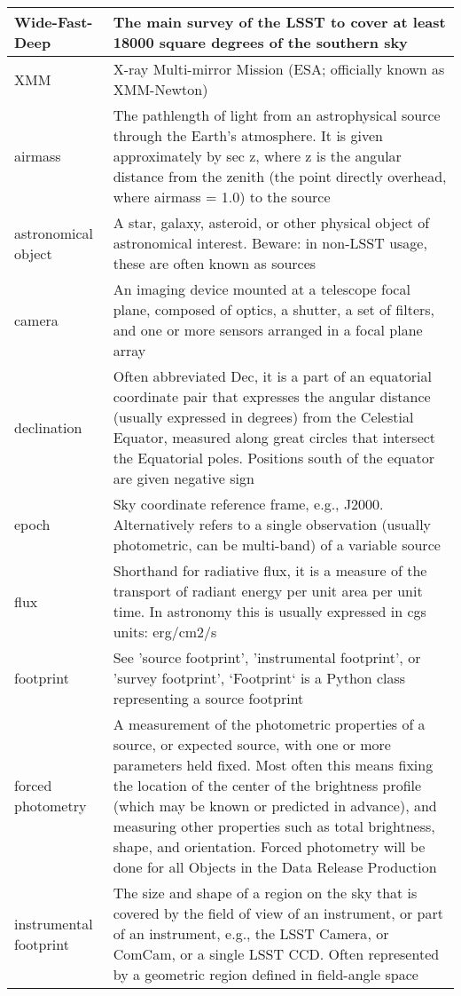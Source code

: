 \begin{longtable}{|p{}|p{}|}
Wide-Fast-Deep & The main survey of the \gls{LSST} to cover at least 18000 square degrees of the southern sky \\\hline
XMM & X-ray Multi-mirror Mission (\gls{ESA}; officially known as \gls{XMM}-Newton) \\\hline
airmass & The pathlength of light from an astrophysical source through the Earth's atmosphere. It is given approximately by sec z, where z is the angular distance from the zenith (the point directly overhead, where \gls{airmass} = 1.0) to the source \\\hline
astronomical object & A star, galaxy, asteroid, or other physical object of astronomical interest. Beware: in non-LSST usage, these are often known as sources \\\hline
camera & An imaging device mounted at a telescope focal plane, composed of optics, a shutter, a set of filters, and one or more sensors arranged in a focal plane array \\\hline
declination & Often abbreviated Dec, it is a part of an equatorial coordinate pair that expresses the angular distance (usually expressed in degrees) from the Celestial Equator, measured along great circles that intersect the Equatorial poles. Positions south of the equator are given negative sign \\\hline
epoch & Sky coordinate reference frame, e.g., J2000. Alternatively refers to a single observation (usually photometric, can be multi-band) of a variable source \\\hline
flux & Shorthand for radiative \gls{flux}, it is a measure of the transport of radiant energy per unit area per unit time. In astronomy this is usually expressed in cgs units: erg/cm2/s \\\hline
footprint & See 'source \gls{footprint}', 'instrumental \gls{footprint}', or 'survey \gls{footprint}', `Footprint` is a Python class representing a source \gls{footprint} \\\hline
forced photometry & A measurement of the photometric properties of a source, or expected source, with one or more parameters held fixed. Most often this means fixing the location of the center of the brightness profile (which may be known or predicted in advance), and measuring other properties such as total brightness, \gls{shape}, and orientation. Forced photometry will be done for all Objects in the \gls{Data Release Production} \\\hline
instrumental \gls{footprint} & The size and \gls{shape} of a region on the sky that is covered by the field of view of an instrument, or part of an instrument, e.g., the \gls{LSST} \gls{Camera}, or ComCam, or a single \gls{LSST} \gls{CCD}.  Often represented by a geometric region defined in field-angle space \\\hline

\end{longtable}
